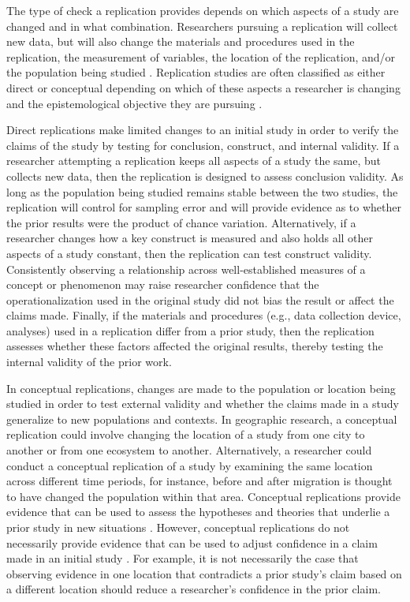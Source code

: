 \documentclass[]{interact}
\theoremstyle{plain}%
\theoremstyle{definition}
\theoremstyle{remark}
\begin{document}
The type of check a replication provides depends on which aspects of a study are changed and in what combination. 
Researchers pursuing a replication will collect new data, but will also change the materials and procedures used in the replication, the measurement of variables, the location of the replication, and/or the population being studied \citep{hendrick1990, schmidt2009, gomez2010replications}. 
Replication studies are often classified as either direct or conceptual depending on which of these aspects a researcher is changing and the epistemological objective they are pursuing \citep[see][]{sargent1981repeatability, schmidt2009, plesser2018reproducibility}.

Direct replications make limited changes to an initial study in order to verify the claims of the study by testing for conclusion, construct, and internal validity. 
If a researcher attempting a replication keeps all aspects of a study the same, but collects new data, then the replication is designed to assess conclusion validity.
As long as the population being studied remains stable between the two studies, the replication will control for sampling error and will provide evidence as to whether the prior results were the product of chance variation. 
Alternatively, if a researcher changes how a key construct is measured and also holds all other aspects of a study constant, then the replication can test construct validity.
Consistently observing a relationship across well-established measures of a concept or phenomenon may raise researcher confidence that the operationalization used in the original study did not bias the result or affect the claims made. 
Finally, if the materials and procedures (e.g., data collection device, analyses) used in a replication differ from a prior study, then the replication assesses whether these factors affected the original results, thereby testing the internal validity of the prior work. 

In conceptual replications, changes are made to the population or location being studied in order to test external validity and whether the claims made in a study generalize to new populations and contexts. 
In geographic research, a conceptual replication could involve changing the location of a study from one city to another or from one ecosystem to another. 
Alternatively, a researcher could conduct a conceptual replication of a study by examining the same location across different time periods, for instance, before and after migration is thought to have changed the population within that area. 
Conceptual replications provide evidence that can be used to assess the hypotheses and theories that underlie a prior study in new situations \citep{schmidt2009}.
However, conceptual replications do not necessarily provide evidence that can be used to adjust confidence in a claim made in an initial study \citep{nosek2020}.
For example, it is not necessarily the case that observing evidence in one location that contradicts a prior study's claim based on a different location should reduce a researcher's confidence in the prior claim.
\end{document}

